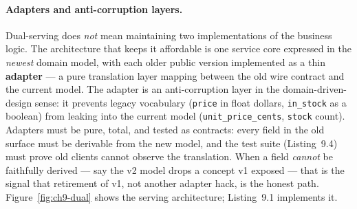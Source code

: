 \paragraph{Adapters and anti-corruption layers.}
Dual-serving does \emph{not} mean maintaining two implementations of the
business logic. The architecture that keeps it affordable is one service core
expressed in the \emph{newest} domain model, with each older public version
implemented as a thin \textbf{adapter} --- a pure translation layer mapping
between the old wire contract and the current model. The adapter is an
anti-corruption layer in the domain-driven-design sense: it prevents legacy
vocabulary (\texttt{price} in float dollars, \texttt{in\_stock} as a boolean)
from leaking into the current model (\texttt{unit\_price\_cents},
\texttt{stock} count). Adapters must be pure, total, and tested as contracts:
every field in the old surface must be derivable from the new model, and the
test suite (Listing~9.4) must prove old clients cannot observe the
translation. When a field \emph{cannot} be faithfully derived --- say the v2
model drops a concept v1 exposed --- that is the signal that retirement of
v1, not another adapter hack, is the honest path. Figure~\ref{fig:ch9-dual}
shows the serving architecture; Listing~9.1 implements it.

